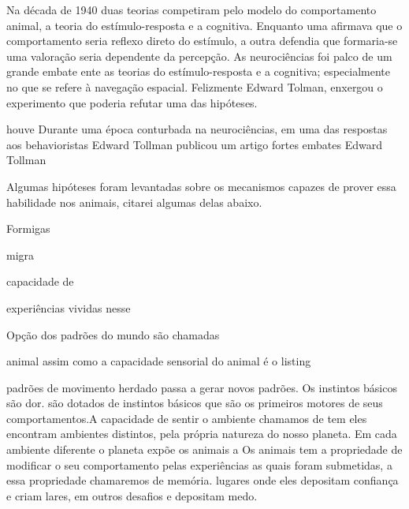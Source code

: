 Na década de 1940 duas teorias competiram pelo modelo do comportamento animal, a teoria do estímulo-resposta e a cognitiva.
Enquanto uma afirmava que o comportamento seria reflexo direto do estímulo, a outra defendia que formaria-se uma valoração
seria dependente da percepção.
As neurociências foi palco de um grande embate ente as teorias do estímulo-resposta e a cognitiva; especialmente no que se refere à navegação espacial.
Felizmente Edward Tolman, enxergou o experimento que poderia refutar uma das hipóteses.

houve Durante uma época conturbada na neurociências, em uma das respostas aos behavioristas Edward Tollman publicou um artigo  fortes embates Edward Tollman 

Algumas hipóteses foram levantadas sobre os mecanismos capazes de prover essa habilidade nos animais, citarei algumas delas abaixo.



Formigas



migra



 capacidade de 



experiências vividas nesse 

Opção dos padrões do mundo são chamadas


animal assim como a capacidade sensorial do animal é o listing

padrões de movimento herdado passa a gerar novos padrões. Os instintos básicos são dor. são dotados de instintos básicos que são os primeiros motores de seus comportamentos.A capacidade de sentir o ambiente chamamos de tem eles encontram ambientes distintos, pela própria natureza do nosso planeta. Em cada ambiente diferente o planeta expõe os animais a Os animais tem a propriedade de modificar o seu comportamento pelas experiências as quais foram submetidas, a essa propriedade chamaremos de memória. lugares onde eles depositam confiança e criam lares, em outros desafios e depositam medo.


